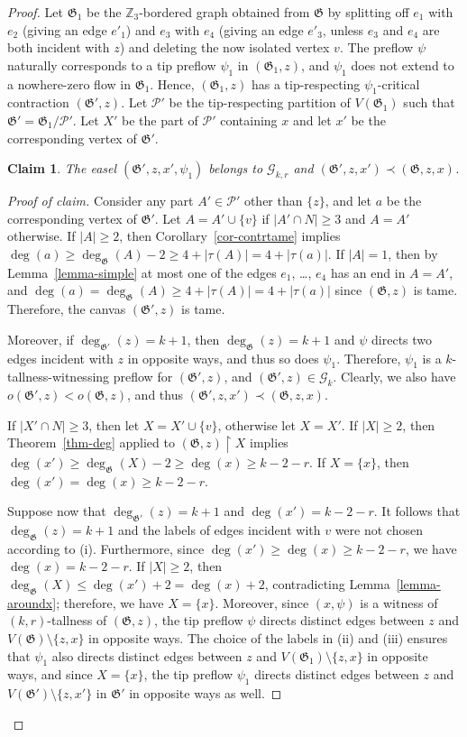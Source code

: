 \documentclass{article}
\newcommand{\Z}{\mathbb{Z}_3}
\newcommand{\PP}{\mathcal{P}}
\newcommand{\GG}{\mathcal{G}}
\newcommand\g{\mathfrak{G}}
\newtheorem*{claim*}{Claim}
\newenvironment{subproof}{%
  \renewcommand{\qedsymbol}{$\blacksquare$}%
  \begin{proof}[Proof of claim]%
}{%
  \end{proof}%
}
\begin{document}
\begin{proof}
Let $\g_1$ be the $\Z$-bordered graph obtained from $\g$ by splitting off $e_1$ with $e_2$ (giving an edge $e'_1$) and $e_3$ with $e_4$
(giving an edge $e'_3$, unless $e_3$ and $e_4$ are both incident with $z$) and deleting the now isolated vertex $v$.
The preflow $\psi$ naturally corresponds to a tip preflow $\psi_1$ in $(\g_1,z)$, and $\psi_1$ does not extend to a nowhere-zero flow in $\g_1$. Hence, $(\g_1,z)$ has a tip-respecting $\psi_1$-critical contraction $(\g',z)$. Let $\PP'$ be the tip-respecting partition of $V(\g_1)$ such that $\g'=\g_1/\PP'$. 
Let $X'$ be the part of $\PP'$ containing $x$ and let $x'$ be the corresponding vertex of $\g'$.
\begin{claim*}
The easel $(\g',z,x',\psi_1)$ belongs to $\GG_{k,r}$ and $(\g',z,x')\prec (\g,z,x)$.
\end{claim*}
\begin{subproof}
Consider any part $A'\in \PP'$ other than $\{z\}$, and let $a$ be the corresponding vertex of $\g'$.
Let $A=A'\cup\{v\}$ if $|A'\cap N|\ge 3$ and $A=A'$ otherwise.
If $|A|\ge 2$, then Corollary~\ref{cor-contrtame} implies $\deg(a)\ge \deg_{\g}(A)-2\ge 4+|\tau(A)|=4+|\tau(a)|$.
If $|A|=1$, then by Lemma~\ref{lemma-simple} at most one of the edges $e_1$, \ldots, $e_4$ has an end in $A=A'$,
and $\deg(a)=\deg_{\g}(A)\ge 4+|\tau(A)|=4+|\tau(a)|$ since $(\g,z)$ is tame.  Therefore, the canvas $(\g',z)$ is tame.

Moreover, if $\deg_{\g'}(z)=k+1$, then $\deg_{\g}(z)=k+1$ and $\psi$ directs two edges incident with $z$ in opposite ways,
and thus so does $\psi_1$.  Therefore, $\psi_1$ is a $k$-tallness-witnessing preflow for $(\g', z)$, and $(\g',z)\in \GG_k$.
Clearly, we also have $o(\g',z)<o(\g,z)$, and thus $(\g',z,x')\prec (\g,z,x)$.

If $|X'\cap N|\ge 3$, then let $X=X'\cup\{v\}$, otherwise let $X=X'$.  If $|X|\ge 2$, then Theorem~\ref{thm-deg} applied to $(\g,z)\restriction X$
implies $\deg(x')\ge \deg_{\g}(X)-2\ge \deg(x)\ge k-2-r$.
If $X=\{x\}$, then $\deg(x')=\deg(x)\ge k-2-r$.

Suppose now that $\deg_{\g'}(z)=k+1$ and $\deg(x')=k-2-r$. It follows that $\deg_{\g}(z)=k+1$ and the labels of edges incident with $v$
were not chosen according to (i).  Furthermore, since $\deg(x')\ge \deg(x)\ge k-2-r$, we have $\deg(x)=k-2-r$.
If $|X|\ge 2$, then $\deg_{\g}(X)\le \deg(x')+2=\deg(x)+2$, contradicting Lemma~\ref{lemma-aroundx}; therefore, we have $X=\{x\}$.
Moreover, since $(x,\psi)$ is a witness of $(k,r)$-tallness of $(\g,z)$,
the tip preflow $\psi$ directs distinct edges between $z$ and $V(\g)\setminus \{z,x\}$ in opposite ways.  The choice of the labels in
(ii) and (iii) ensures that $\psi_1$ also directs distinct edges between $z$ and $V(\g_1)\setminus \{z,x\}$ in opposite ways,
and since $X=\{x\}$, the tip preflow $\psi_1$ directs distinct edges between $z$ and $V(\g')\setminus \{z,x'\}$ in $\g'$ in opposite ways as well.


\end{subproof}
\end{proof}
\end{document}
